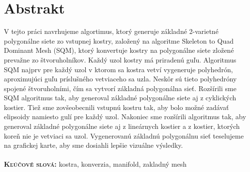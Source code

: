 \chapter{Abstrakt}
V tejto práci navrhujeme algortimus, ktorý generuje základné 2-varietné polygonálne siete zo vstupnej kostry, založený na algoritme Skeleton to Quad Dominant Mesh (SQM), ktorý konvertuje kostry na polygonálne siete zložené prevažne zo štvoruholníkov.
Každý uzol kostry má priradenú guľu.
Algoritmus SQM najprv pre každý uzol v ktorom sa kostra vetví vygeneruje polyhedrón, aproximujúci guľu príslušného vetviaceho sa uzla.
Neskôr sú tieto polyhedróny spojené štvoruholními, čím sa vytvorí základná polygonálna sieť.
Rozšírili sme SQM algoritmus tak, aby generoval základné polygonálne siete aj z cyklických kostier.
Tiež sme zovšeobecnili vstupnú kostru tak, aby bolo možné zadávať elipsoidy namiesto gulí pre každý uzol.
Nakoniec sme rozšírili algoritmus tak, aby generoval základné polygonálne siete aj z lineárnych kostier a z kostier, ktorých koreň nie je vetviaci sa uzol.
Vygenerovanú základnú polygonálnu sieť teselujeme na grafickej karte, aby sme dosiahli lepšie vizuálne výsledky.
\\ \\
\textbf{\textsc{Kľúčové slová:}} kostra, konverzia, manifold, zakladný mesh